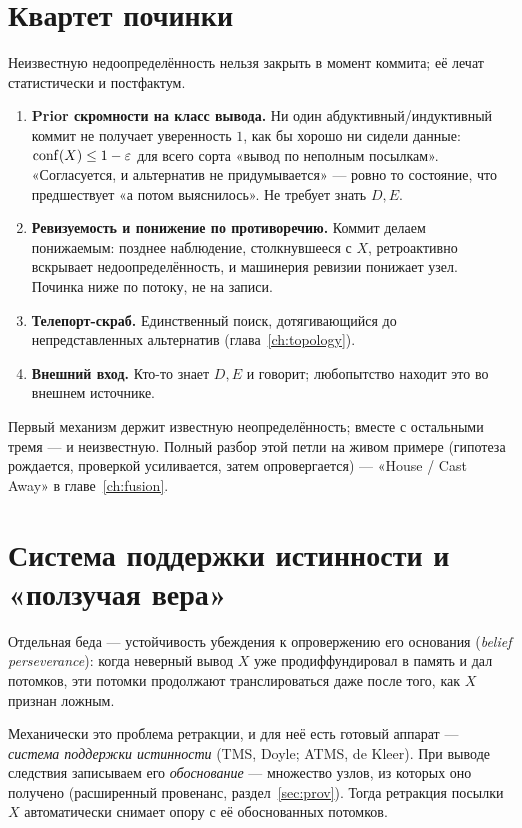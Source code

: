 \section{Квартет починки}

Неизвестную недоопределённость нельзя закрыть в момент коммита; её лечат
статистически и постфактум.
\begin{enumerate}
\item \textbf{Prior скромности на класс вывода.} Ни один
абдуктивный/индуктивный коммит не получает уверенность $1$, как бы хорошо ни
сидели данные: $\mathrm{conf}(X) \le 1 - \varepsilon$ для всего сорта «вывод по
неполным посылкам». «Согласуется, и альтернатив не придумывается» --- ровно
то состояние, что предшествует «а потом выяснилось». Не требует знать $D, E$.
\item \textbf{Ревизуемость и понижение по противоречию.} Коммит делаем
понижаемым: позднее наблюдение, столкнувшееся с $X$, ретроактивно вскрывает
недоопределённость, и машинерия ревизии понижает узел. Починка ниже по
потоку, не на записи.
\item \textbf{Телепорт-скраб.} Единственный поиск, дотягивающийся до
непредставленных альтернатив (глава~\ref{ch:topology}).
\item \textbf{Внешний вход.} Кто-то знает $D, E$ и говорит; любопытство
находит это во внешнем источнике.
\end{enumerate}
Первый механизм держит известную неопределённость; вместе с остальными тремя
--- и неизвестную. Полный разбор этой петли на живом примере (гипотеза
рождается, проверкой усиливается, затем опровергается) --- «House / Cast Away»
в главе~\ref{ch:fusion}.

\section{Система поддержки истинности и «ползучая вера»}

Отдельная беда --- устойчивость убеждения к опровержению его основания
(\textit{belief perseverance}): когда неверный вывод $X$ уже продиффундировал
в память и дал потомков, эти потомки продолжают транслироваться даже после
того, как $X$ признан ложным.

Механически это проблема ретракции, и для неё есть готовый аппарат ---
\emph{система поддержки истинности} (TMS, Doyle; ATMS, de Kleer). При выводе
следствия записываем его \emph{обоснование} --- множество узлов, из которых
оно получено (расширенный провенанс, раздел~\ref{sec:prov}). Тогда ретракция
посылки $X$ автоматически снимает опору с её обоснованных потомков.

